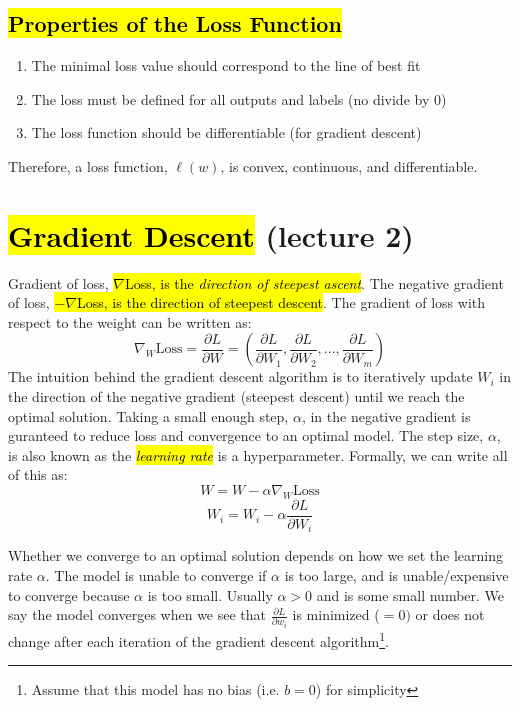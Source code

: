 \documentclass[11pt]{article}
\newcommand{\hlinfo}[1]{{\sethlcolor{lavender}\hl{#1}}}
\begin{document}

\subsection{\hl{Properties of the Loss Function}}

\begin{enumerate}
    \item {The minimal loss value should correspond to the line of best fit}
    \item {The loss must be defined for all outputs and labels (no divide by 0)}
    \item {The loss function should be differentiable (for gradient descent)}
\end{enumerate}

Therefore, a loss function, $\ell(w)$, is convex, continuous, and differentiable.

\section{\hl{Gradient Descent} (lecture 2)}

Gradient of loss, \hlinfo{$\nabla$Loss, is the \emph{direction of steepest ascent}}. The negative gradient of loss, \hlinfo{$-\nabla$Loss, is the direction of steepest descent}. The gradient of loss with respect to the weight can be written as:
\[\nabla_W \text{Loss} = \frac{\partial L}{\partial W} = \left( \frac{\partial L}{\partial W_1}, \frac{\partial L}{\partial W_2}, ..., \frac{\partial L}{\partial W_m} \right)\]
The intuition behind the gradient descent algorithm is to iteratively update $W_i$ in the direction of the negative gradient (steepest descent) until we reach the optimal solution. Taking a small enough step, $\alpha$, in the negative gradient is guranteed to reduce loss and convergence to an optimal model. The step size, $\alpha$, is also known as the \hlinfo{\emph{learning rate}} is a hyperparameter. Formally, we can write all of this as:
\[W = W - \alpha \nabla_W \text{Loss}\]
\[W_i = W_i - \alpha \frac{\partial L}{\partial W_i}\]

Whether we converge to an optimal solution depends on how we set the learning rate $\alpha$. The model is unable to converge if $\alpha$ is too large, and is unable/expensive to converge because $\alpha$ is too small. Usually $\alpha > 0$ and is some small number. We say the model converges when we see that $\frac{\partial L}{\partial w_i}$ is minimized ($=0)$ or does not change after each iteration of the gradient descent algorithm\footnote{Assume that this model has no bias (i.e. $b=0$) for simplicity}.
\end{document}
